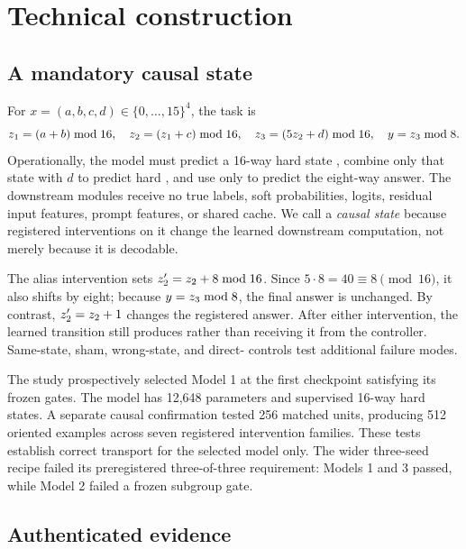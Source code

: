 \section{Technical construction}

\subsection{A mandatory causal state}

For $x=(a,b,c,d)\in\{0,\ldots,15\}^4$, the task is
\begin{equation}
z_1=(a+b)\bmod16,\quad z_2=(z_1+c)\bmod16,\quad
z_3=(5z_2+d)\bmod16,\quad y=z_3\bmod8.
\end{equation}
Operationally, the model must predict a 16-way hard state \ztwo{}, combine only
that state with $d$ to predict hard \zthree{}, and use only \zthree{} to predict
the eight-way answer. The downstream modules receive no true labels, soft
probabilities, logits, residual input features, prompt features, or shared
cache. We call \ztwo{} a \emph{causal state} because registered interventions on
it change the learned downstream computation, not merely because it is
decodable.

The alias intervention sets $z_2'=z_2+8\bmod16$. Since
$5\cdot8=40\equiv8\pmod{16}$, it also shifts \zthree{} by eight; because
$y=z_3\bmod8$, the final answer is unchanged. By contrast,
$z_2'=z_2+1$ changes the registered answer. After either intervention, the
learned transition still produces \zthree{} rather than receiving it from the
controller. Same-state, sham, wrong-state, and direct-\zthree{} controls test
additional failure modes.

The study prospectively selected Model 1 at the first checkpoint satisfying its
frozen gates. The model has 12,648 parameters and supervised 16-way hard
states. A separate causal confirmation tested 256 matched units, producing 512
oriented examples across seven registered intervention families. These tests
establish correct transport for the selected model only. The wider
three-seed recipe failed its preregistered three-of-three requirement: Models 1
and 3 passed, while Model 2 failed a frozen subgroup gate.

\subsection{Authenticated evidence}

